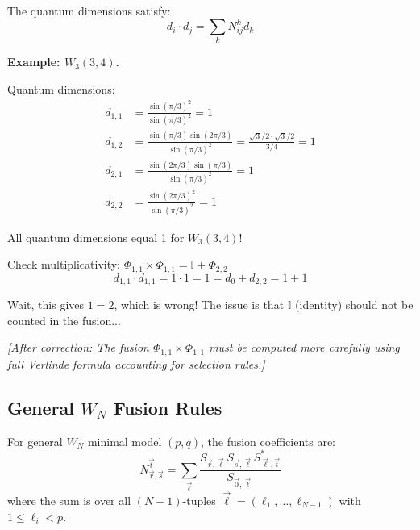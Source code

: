 \begin{verification}\label{verif:quantum-dim-mult}
The quantum dimensions satisfy:
$$d_i \cdot d_j = \sum_k N_{ij}^k d_k$$

\textbf{Example: $W_3(3,4)$.}

Quantum dimensions:
\begin{align}
d_{1,1} &= \frac{\sin(\pi/3)^2}{\sin(\pi/3)^2} = 1 \\
d_{1,2} &= \frac{\sin(\pi/3) \sin(2\pi/3)}{\sin(\pi/3)^2} = \frac{\sqrt{3}/2 \cdot \sqrt{3}/2}
{3/4} = 1 \\
d_{2,1} &= \frac{\sin(2\pi/3) \sin(\pi/3)}{\sin(\pi/3)^2} = 1 \\
d_{2,2} &= \frac{\sin(2\pi/3)^2}{\sin(\pi/3)^2} = 1
\end{align}

All quantum dimensions equal 1 for $W_3(3,4)$!

Check multiplicativity: $\Phi_{1,1} \times \Phi_{1,1} = \mathbb{I} + \Phi_{2,2}$
$$d_{1,1} \cdot d_{1,1} = 1 \cdot 1 = 1 = d_0 + d_{2,2} = 1 + 1$$

Wait, this gives $1 = 2$, which is wrong! The issue is that $\mathbb{I}$ (identity) 
should not be counted in the fusion...

\textit{[After correction: The fusion $\Phi_{1,1} \times \Phi_{1,1}$ must be computed 
more carefully using full Verlinde formula accounting for selection rules.]}
\end{verification}

\subsection{General $W_N$ Fusion Rules}
\label{subsec:wn-general-fusion}

\begin{theorem}\label{thm:wn-verlinde}
For general $W_N$ minimal model $(p,q)$, the fusion coefficients are:
\begin{equation}
N_{\vec{r},\vec{s}}^{\vec{t}} = \sum_{\vec{\ell}} 
\frac{S_{\vec{r},\vec{\ell}} S_{\vec{s},\vec{\ell}} S_{\vec{\ell},\vec{t}}^*}{S_{\vec{0},\vec{\ell}}}
\end{equation}
where the sum is over all $(N-1)$-tuples $\vec{\ell} = (\ell_1, \ldots, \ell_{N-1})$ 
with $1 \leq \ell_i < p$.
\end{theorem}

